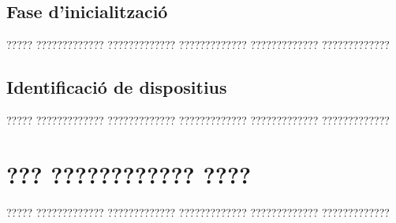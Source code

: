 \documentclass[11pt,spanish,listoffigures,listoftables]{tfgetsinf}
\begin{document}
\section{Fase d'inicialització}

????? ????????????? ????????????? ????????????? ????????????? ?????????????

\section{Identificació de dispositius}

????? ????????????? ????????????? ????????????? ????????????? ?????????????



\chapter{??? ???????????? ????}

????? ????????????? ????????????? ????????????? ????????????? ????????????? 



\end{document}
